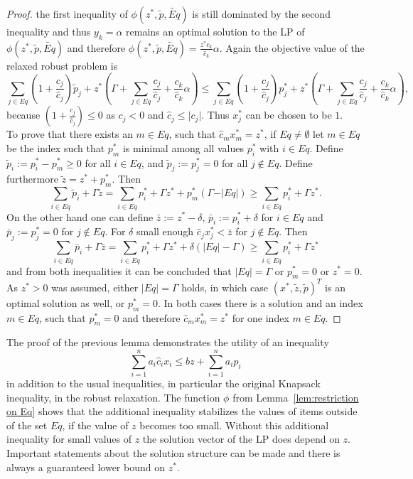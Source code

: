 \documentclass[titlepage, a4paper]{amsbook}
\theoremstyle{plain}
\theoremstyle{break}
\theoremstyle{definition}
\theoremstyle{remark}
\numberwithin{equation}{thm}
\begin{document}
\begin{proof}
the first inequality of 
$\phi(z^*, \tilde{p}, \widetilde{Eq})$ is still dominated by the second inequality and thus $y_k=\alpha$ remains an optimal solution to the LP of $\phi(z^*, \tilde{p}, \widetilde{Eq})$ and therefore $\phi(z^*, \tilde{p}, \widetilde{Eq})=\frac{z^*c_k}{\hat{c}_k}\alpha$. Again the objective value of the relaxed robust problem is
\[\sum_{j \in Eq} (1+\frac{c_j}{\hat{c}_j})\tilde{p}_j + z^*(\Gamma + \sum_{j \in Eq}\frac{c_j}{\hat{c}_j} + \frac{c_k}{\hat{c}_k}\alpha) \leq \sum_{j \in Eq} (1+\frac{c_j}{\hat{c}_j})p^*_j + z^*(\Gamma + \sum_{j \in Eq}\frac{c_j}{\hat{c}_j} + \frac{c_k}{\hat{c}_k}\alpha),\]
because $(1+\frac{c_j}{\hat{c}_j}) \leq 0$ as $c_j < 0$ and $\hat{c}_j \leq \vert c_j \vert$. Thus $x^*_j$ can be chosen to be $1$. \\
To prove that there exists an $m \in Eq$, such that $\hat{c}_mx^*_m=z^*$, if $Eq \neq \emptyset$ let $m \in Eq$ be the index such that $p^*_m$ is minimal among all values $p^*_i$ with $i \in Eq$. Define $\tilde{p}_i:=p^*_i-p^*_m \geq 0$ for all $i \in Eq$, and $\tilde{p}_j:=p^*_j=0$ for all $j \notin Eq$. Define furthermore $\tilde{z}=z^*+p^*_m$. Then 
\[\sum_{i \in Eq}\tilde{p}_i + \Gamma \tilde{z} = \sum_{i \in Eq}p^*_i + \Gamma z^* + p^*_m (\Gamma -\vert Eq \vert) \geq \sum_{i \in Eq}p^*_i + \Gamma z^*.\]
On the other hand one can define $\bar{z}:=z^*-\delta$, $\bar{p}_i:=p^*_i + \delta$ for $i \in Eq$ and $\bar{p}_j:=p^*_j=0$ for $j \notin Eq$. For $\delta$ small enough $\hat{c}_jx^*_j < \bar{z}$ for $j \notin Eq$. Then
\[\sum_{i \in Eq}\bar{p}_i + \Gamma \bar{z} = \sum_{i \in Eq}p^*_i + \Gamma z^* + \delta (\vert Eq \vert - \Gamma) \geq \sum_{i \in Eq}p^*_i + \Gamma z^*\]
and from both inequalities it can be concluded that $\vert Eq \vert = \Gamma$ or $p^*_m=0$ or $z^*=0$. As $z^* > 0$ was assumed, either
$\vert Eq \vert = \Gamma$ holds, in which case $(x^*, \tilde{z}, \tilde{p})^T$ is an optimal solution as well, or $p^*_m=0$. In both cases there is a solution and an index $m \in Eq$, such that $p^*_m=0$ and therefore $\hat{c}_m x^*_m= z^*$ for one index $m \in Eq$.
\end{proof}
The proof of the previous lemma demonstrates the utility of an inequality 
\[\sum_{i=1}^n a_i \hat{c}_i x_i \leq bz + \sum_{i=1}^n a_i p_i\]
in addition to the usual inequalities, in particular the original Knapsack inequality, in the robust relaxation. The function $\phi$ from Lemma~\ref{lem:restriction on Eq} shows that the additional inequality stabilizes the values of items outside of the set $Eq$, if the value of $z$ becomes too small. Without this additional inequality for small values of $z$ the solution vector of the LP does depend on $z$. Important statements about the solution structure can be made and there is always a guaranteed lower bound on $z^*$.
\end{document}
